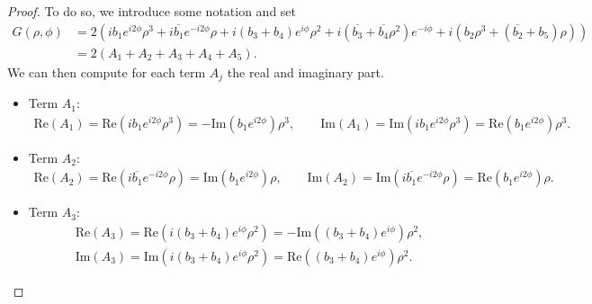 \documentclass[10pt]{article}
\theoremstyle{definition}
\theoremstyle{definition}
\numberwithin{equation}{section}
\newcommand{\R}{\mathbb{R}}
\newcommand{\im}[1]{\mathrm{Im} \left(#1\right)}
\newcommand{\re}[1]{\mathrm{Re}\left(#1\right)}
\begin{document}
\begin{proof}
    To do so, we introduce some notation and set
    \begin{equation*}
    \begin{aligned}
        G(\rho, \phi)
        &= 2 \left( ib_1e^{i2\phi} \rho^3 + i \overline{b_1} e^{-i2\phi} \rho + i(b_3 + b_4) e^{i\phi} \rho^2 + i (\overline{b_3} + \overline{b_4} \rho^2) e^{-i\phi} + i \left( b_2 \rho^3 + (\overline{b_2} + b_5) \rho \right) \right)\\
        &= 2 \left( A_1 + A_2 + A_3 + A_4 + A_5 \right).
    \end{aligned}
    \end{equation*}
    We can then compute for each term $A_j$ the real and imaginary part.
    \begin{itemize}
        \item Term $A_1$:
        \begin{equation*}
        \begin{aligned}
        \re{A_1} = \re{ib_1 e^{i2\phi} \rho^3} = - \im{b_1 e^{i2\phi}} \rho^3, \qquad 
        \im{A_1} = \im{ib_1 e^{i2\phi} \rho^3} = \re{b_1 e^{i2\phi}} \rho^3.
        \end{aligned}
        \end{equation*}
    
        \item Term $A_2$:
        \begin{equation*}
        \begin{aligned}
        \re{A_2} = \re{i\overline{b_1} e^{-i2\phi} \rho} = \im{b_1 e^{i2\phi}} \rho, \qquad \im{A_2} = \im{i\overline{b_1} e^{-i2\phi} \rho} = \re{b_1 e^{i2\phi}} \rho .
        \end{aligned}
        \end{equation*}
    
        \item Term $A_3$:
        \begin{equation*}
        \begin{aligned}
        &\re{A_3} = \re{i(b_3 + b_4) e^{i\phi} \rho^2} = - \im{(b_3 + b_4) e^{i\phi}} \rho^2,\\[5pt]
        &\im{A_3} = \im{i(b_3 + b_4) e^{i\phi} \rho^2} = \re{(b_3 + b_4) e^{i\phi}} \rho^2 .
        \end{aligned}
        \end{equation*}
    

\end{itemize}
\end{proof}
\end{document}
